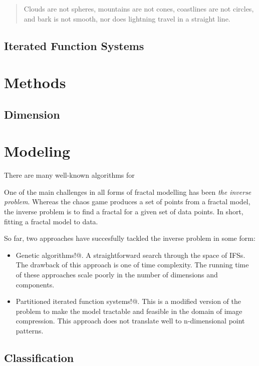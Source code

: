 \documentclass{article}
\theoremstyle{definition}
\begin{document}
\begin{quotation}
\noindent Clouds are not spheres, mountains are not cones, coastlines are not circles, and bark is not smooth, nor does lightning travel in a straight line.
\end{quotation}

\subsection{Iterated Function Systems}


\section{Methods}

\subsection{Dimension}

\section{Modeling}

There are many well-known algorithms for 

One of the main challenges in all forms of fractal modelling has been \textit{the inverse problem}. Whereas the chaos game produces a set of points from a fractal model, the inverse problem is to find a fractal for a given set of data points. In short, fitting a fractal model to data.

So far, two approaches have succesfully tackled the inverse problem in some form:
\begin{itemize}
  \item Genetic algorithms!@. A straightforward search through the space of IFSs. The drawback of this approach is one of time complexity. The running time of these approaches scale poorly in the number of dimensions and components.
  \item Partitioned iterated function systems!@. This is a modified version of the problem to make the model tractable and feasible in the domain of image compression. This approach does not translate well to n-dimensional point patterns.
\end{itemize}


\subsection{Classification}
\end{document}
